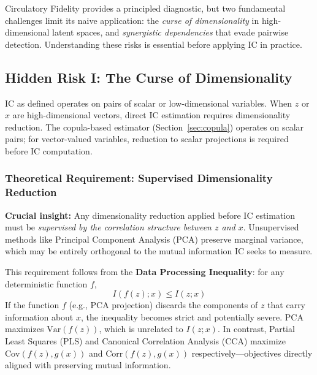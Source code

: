 \documentclass[10pt]{article} %
\theoremstyle{plain}
\theoremstyle{definition}
\newcommand{\Var}{\mathrm{Var}}
\newcommand{\Cov}{\mathrm{Cov}}
\begin{document}
Circulatory Fidelity provides a principled diagnostic, but two fundamental challenges limit its naive application: the \emph{curse of dimensionality} in high-dimensional latent spaces, and \emph{synergistic dependencies} that evade pairwise detection. Understanding these risks is essential before applying IC in practice.

\subsection{Hidden Risk I: The Curse of Dimensionality}
\label{sec:dimensionality}

IC as defined operates on pairs of scalar or low-dimensional variables. When $z$ or $x$ are high-dimensional vectors, direct IC estimation requires dimensionality reduction. The copula-based estimator (Section~\ref{sec:copula}) operates on scalar pairs; for vector-valued variables, reduction to scalar projections is required before IC computation.

\subsubsection{Theoretical Requirement: Supervised Dimensionality Reduction}

\textbf{Crucial insight:} Any dimensionality reduction applied before IC estimation must be \emph{supervised by the correlation structure between $z$ and $x$}. Unsupervised methods like Principal Component Analysis (PCA) preserve marginal variance, which may be entirely orthogonal to the mutual information IC seeks to measure.

This requirement follows from the \textbf{Data Processing Inequality}: for any deterministic function $f$,
\begin{equation}
I(f(z); x) \leq I(z; x)
\end{equation}
If the function $f$ (e.g., PCA projection) discards the components of $z$ that carry information about $x$, the inequality becomes strict and potentially severe. PCA maximizes $\Var(f(z))$, which is unrelated to $I(z; x)$. In contrast, Partial Least Squares (PLS) and Canonical Correlation Analysis (CCA) maximize $\Cov(f(z), g(x))$ and $\text{Corr}(f(z), g(x))$ respectively---objectives directly aligned with preserving mutual information.
\end{document}
